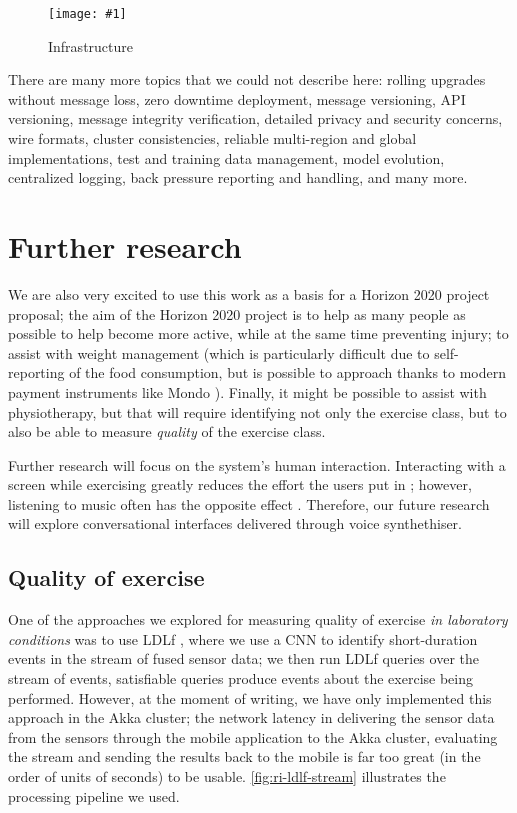 \documentclass[a4paper, 10 pt, conference]{IEEEtran}
\newcommand{\fig}[3]{
  \begin{figure}[h]
    \begin{center}
        \caption{#3}
        \texttt{[image: \#1]}
        \label{fig:#2}
    \end{center}
  \end{figure}
}
\begin{document}
\fig{ri-infrastructure.png}{ri-infrastructure}{Infrastructure}

There are many more topics that we could not describe here: rolling upgrades without message loss, zero downtime deployment, message versioning, API versioning, message integrity verification, detailed privacy and security concerns, wire formats, cluster consistencies, reliable multi-region and global implementations, test and training data management, model evolution, centralized logging, back pressure reporting and handling, and many more. 

\section{Further research}

We are also very excited to use this work as a basis for a Horizon 2020 \cite{horizon2020} project proposal; the aim of the Horizon 2020 project is to help as many people as possible to help become more active, while at the same time preventing injury; to assist with weight management (which is particularly difficult due to self-reporting of the food consumption, but is possible to approach thanks to modern payment instruments like Mondo \cite{mondo}). Finally, it might be possible to assist with physiotherapy, but that will require identifying not only the exercise class, but to also be able to measure \emph{quality} of the exercise class.

Further research will focus on the system's human interaction. Interacting with a screen while exercising greatly reduces the effort the users put in \cite{!!!}; however, listening to music often has the opposite effect \cite{!!!}. Therefore, our future research will explore conversational interfaces delivered through voice synthethiser. 

\subsection{Quality of exercise}

One of the approaches we explored for measuring quality of exercise \emph{in laboratory conditions} was to use LDLf \cite{ldlf}, where we use a CNN to identify short-duration events in the stream of fused sensor data; we then run LDLf queries over the stream of events, satisfiable queries produce events about the exercise being performed. However, at the moment of writing, we have only implemented this approach in the Akka cluster; the network latency in delivering the sensor data from the sensors through the mobile application to the Akka cluster, evaluating the stream and sending the results back to the mobile is far too great (in the order of units of seconds) to be usable. \autoref{fig:ri-ldlf-stream} illustrates the processing pipeline we used.
\end{document}
